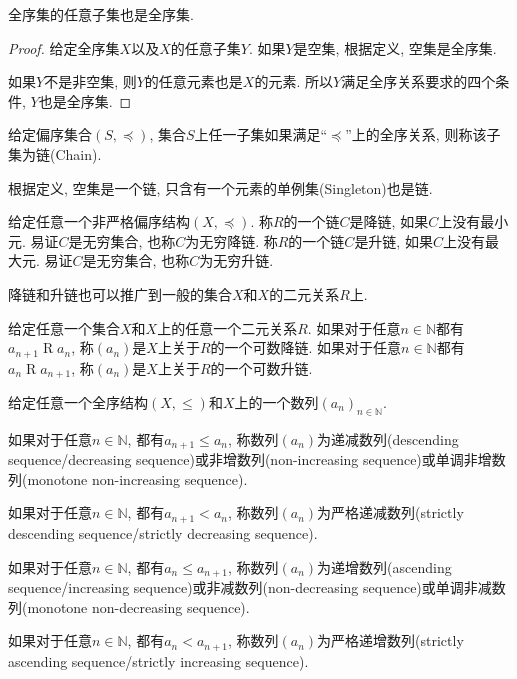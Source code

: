 \begin{proposition}
	全序集的任意子集也是全序集.
\end{proposition}

\begin{proof}
	给定全序集$X$以及$X$的任意子集$Y$. 如果$Y$是空集, 根据定义, 空集是全序集.
	
	如果$Y$不是非空集, 则$Y$的任意元素也是$X$的元素. 所以$Y$满足全序关系要求的四个条件, $Y$也是全序集.
\end{proof}

\begin{definition}[链]
	给定偏序集合$(S,\preccurlyeq)$, 集合$S$上任一子集如果满足``$\preccurlyeq$''上的全序关系, 则称该子集为链(Chain).
\end{definition}

根据定义, 空集是一个链, 只含有一个元素的单例集(Singleton)也是链.

\begin{definition}
	给定任意一个非严格偏序结构$(X,\preccurlyeq)$. 称$R$的一个链$C$是降链, 如果$C$上没有最小元. 易证$C$是无穷集合, 也称$C$为无穷降链. 称$R$的一个链$C$是升链, 如果$C$上没有最大元. 易证$C$是无穷集合, 也称$C$为无穷升链.
\end{definition}

降链和升链也可以推广到一般的集合$X$和$X$的二元关系$R$上.

\begin{definition}
	给定任意一个集合$X$和$X$上的任意一个二元关系$R$. 如果对于任意$n\in \mathbb N$都有$a_{n+1}\mathrel Ra_n$, 称$(a_n)$是$X$上关于$R$的一个可数降链. 如果对于任意$n\in \mathbb N$都有$a_n\mathrel Ra_{n+1}$, 称$(a_n)$是$X$上关于$R$的一个可数升链.
\end{definition}

\begin{definition}
	给定任意一个全序结构$(X,\leq)$和$X$上的一个数列$(a_n)_{n\in \mathbb N}$.
	
	如果对于任意$n\in \mathbb N$, 都有$a_{n+1}\leq a_n$, 称数列$(a_n)$为递减数列(descending sequence/decreasing sequence)或非增数列(non-increasing sequence)或单调非增数列(monotone non-increasing sequence).
	
	如果对于任意$n\in \mathbb N$, 都有$a_{n+1}<a_n$, 称数列$(a_n)$为严格递减数列(strictly descending sequence/strictly decreasing sequence).
	
	如果对于任意$n\in \mathbb N$, 都有$a_n\leq a_{n+1}$, 称数列$(a_n)$为递增数列(ascending sequence/increasing sequence)或非减数列(non-decreasing sequence)或单调非减数列(monotone non-decreasing sequence).
	
	如果对于任意$n\in \mathbb N$, 都有$a_n<a_{n+1}$, 称数列$(a_n)$为严格递增数列(strictly ascending sequence/strictly increasing sequence).
\end{definition}

